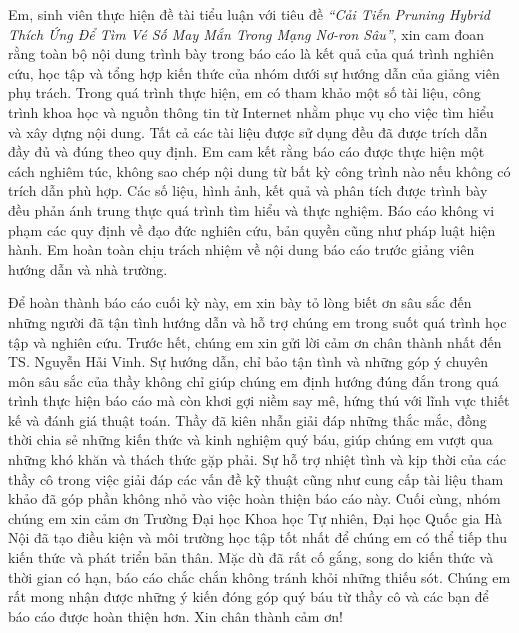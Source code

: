 \documentclass[
    fontsize=13pt,
    paper=a4,
    oneside,
    DIV=calc,
    chapterprefix=true
]{scrbook}
\begin{document}
\begingroup
\centering
\coverpage
\endgroup


\frontmatter
\pagestyle{fancy}


\begin{declaration}
Em, sinh viên thực hiện đề tài tiểu luận với tiêu đề \textit{“Cải Tiến Pruning Hybrid Thích Ứng Để Tìm Vé Số May Mắn Trong Mạng Nơ-ron Sâu”}, xin cam đoan rằng toàn bộ nội dung trình bày trong báo cáo là kết quả của quá trình nghiên cứu, học tập và tổng hợp kiến thức của nhóm dưới sự hướng dẫn của giảng viên phụ trách. Trong quá trình thực hiện, em có tham khảo một số tài liệu, công trình khoa học và nguồn thông tin từ Internet nhằm phục vụ cho việc tìm hiểu và xây dựng nội dung. Tất cả các tài liệu được sử dụng đều đã được trích dẫn đầy đủ và đúng theo quy định.
\noindent
Em cam kết rằng báo cáo được thực hiện một cách nghiêm túc, không sao chép nội dung từ bất kỳ công trình nào nếu không có trích dẫn phù hợp. Các số liệu, hình ảnh, kết quả và phân tích được trình bày đều phản ánh trung thực quá trình tìm hiểu và thực nghiệm. Báo cáo không vi phạm các quy định về đạo đức nghiên cứu, bản quyền cũng như pháp luật hiện hành. Em hoàn toàn chịu trách nhiệm về nội dung báo cáo trước giảng viên hướng dẫn và nhà trường.
\end{declaration}

\begin{acknowledgments}
Để hoàn thành báo cáo cuối kỳ này, em xin bày tỏ lòng biết ơn sâu sắc đến những
người đã tận tình hướng dẫn và hỗ trợ chúng em trong suốt quá trình học tập và nghiên cứu.
Trước hết, chúng em xin gửi lời cảm ơn chân thành nhất đến TS. Nguyễn Hải Vinh. Sự hướng dẫn, chỉ bảo tận tình và những góp ý chuyên
môn sâu sắc của thầy không chỉ giúp chúng em định hướng đúng đắn trong quá trình thực
hiện báo cáo mà còn khơi gợi niềm say mê, hứng thú với lĩnh vực thiết kế và đánh giá thuật
toán. Thầy đã kiên nhẫn giải đáp những thắc mắc, đồng thời chia sẻ những kiến thức và kinh
nghiệm quý báu, giúp chúng em vượt qua những khó khăn và thách thức gặp phải. Sự hỗ trợ
nhiệt tình và kịp thời của các thầy cô trong việc giải đáp các vấn đề kỹ thuật cũng như cung cấp
tài liệu tham khảo đã góp phần không nhỏ vào việc hoàn thiện báo cáo này.
Cuối cùng, nhóm chúng em xin cảm ơn Trường Đại học Khoa học Tự nhiên, Đại học Quốc gia
Hà Nội đã tạo điều kiện và môi trường học tập tốt nhất để chúng em có thể tiếp thu kiến thức
và phát triển bản thân.
Mặc dù đã rất cố gắng, song do kiến thức và thời gian có hạn, báo cáo chắc chắn không tránh
khỏi những thiếu sót. Chúng em rất mong nhận được những ý kiến đóng góp quý báu từ thầy cô
và các bạn để báo cáo được hoàn thiện hơn.
Xin chân thành cảm ơn!\end{acknowledgments}
\end{document}
